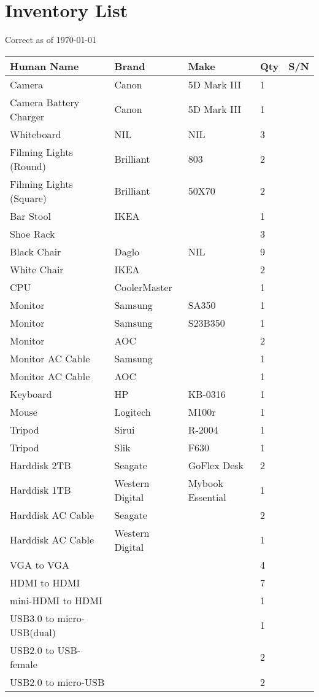 \documentclass[DIV=classic,11pt,abstracton,numbers=noenddot,listof=totoc,bibliography=totoc,parskip]{scrartcl}
\begin{document}
\section*{Inventory List}
Correct as of \today
\begin{longtabu} to \linewidth {X[2,l]X[1.2,l]X[1,c]X[1,l]X[1,l]}
\toprule
\textbf{Human Name} & \textbf{Brand} & \textbf{Make} & \textbf{Qty} & \textbf{S/N}\\ \midrule\endhead
Camera & Canon & 5D Mark III & 1 & \\
Camera Battery Charger & Canon & 5D Mark III & 1 & \\
Whiteboard & NIL & NIL & 3 & \\
Filming Lights (Round) & Brilliant & 803 & 2 & \\
Filming Lights (Square) & Brilliant & 50X70 & 2 & \\
Bar Stool & IKEA & & 1 & \\
Shoe Rack &  & & 3 & \\
Black Chair & Daglo & NIL & 9 & \\
White Chair & IKEA & & 2 & \\
CPU & CoolerMaster &  & 1 & \\
Monitor & Samsung & SA350 & 1 & \\
Monitor & Samsung & S23B350 & 1 & \\
Monitor & AOC && 2 & \\
Monitor AC Cable & Samsung && 1 & \\
Monitor AC Cable & AOC && 1 & \\ 
Keyboard & HP & KB-0316 & 1 & \\
Mouse & Logitech & M100r & 1 & \\
Tripod & Sirui & R-2004 & 1 & \\
Tripod & Slik & F630 & 1 & \\
Harddisk 2TB & Seagate & GoFlex Desk & 2 & \\ 
Harddisk 1TB & Western Digital & Mybook Essential & 1 & \\
Harddisk AC Cable & Seagate && 2 & \\
Harddisk AC Cable & Western Digital && 1 & \\
VGA to VGA &&& 4 & \\
HDMI to HDMI &&& 7 & \\
mini-HDMI to HDMI &&& 1 &\\
USB3.0 to micro-USB(dual) &&& 1 & \\
USB2.0 to USB-female &&& 2 & \\
USB2.0 to micro-USB &&& 2 & \\

\end{longtabu}
\end{document}
